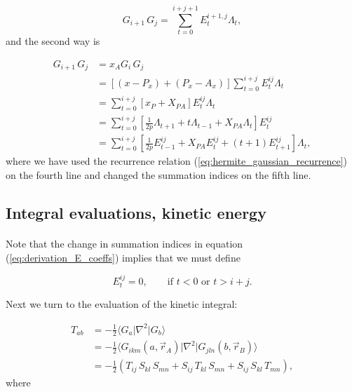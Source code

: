 \documentclass[%
twoside,                 %
final,                   %
10pt]{article}
\begin{document}
\begin{equation}
 G_{i+1}\,G_j= \sum_{t=0}^{i+j+1}E^{i+1,j}_t \Lambda_t,
\end{equation}
and the second way is

\begin{equation}
\label{eq:derivation_E_coeffs}
\begin{split}
 G_{i+1}\,G_j & = x_A G_i\,G_j \\
              & = [(x - P_x) + (P_x - A_x)]\sum_{t=0}^{i+j} E^{ij}_t \Lambda_t\\
              & = \sum_{t=0}^{i+j}[x_P + X_{PA}] E^{ij}_t \Lambda_t \\
              & = \sum_{t=0}^{i+j}[\frac{1}{2p}\Lambda_{t+1} + t\Lambda_{t-1} + X_{PA}\Lambda_t]E^{ij}_t \\
              & = \sum_{t=0}^{i+j}[\frac{1}{2p}E^{ij}_{t-1} + X_{PA}E^{ij}_t + (t+1)E^{ij}_{t+1}] \Lambda_t,
\end{split}
\end{equation}
where we have used the recurrence relation (\ref{eq:hermite_gaussian_recurrence}) on the fourth line and changed the 
summation indices on the fifth line.



\subsection*{Integral evaluations, kinetic energy}

\paragraph{}

Note that the change in summation indices in equation (\ref{eq:derivation_E_coeffs}) implies that we must define

\begin{equation}
 E^{ij}_t = 0, \qquad \text{if }t<0\text{ or }t > i + j.
\end{equation}

Next we turn to the evaluation of the kinetic integral:

\begin{equation}
\begin{split}
T_{ab} & = -\frac{1}{2}\langle G_a\vert\nabla^2\vert G_b\rangle \\
       & = -\frac{1}{2}\langle G_{ikm}(a, \vec r_A)\vert\nabla^2\vert G_{jln}(b, \vec r_B)\rangle \\
       & = -\frac{1}{2}(T_{ij}\,S_{kl}\,S_{mn} + S_{ij}\,T_{kl}\,S_{mn} + S_{ij}\,S_{kl}\,T_{mn}),
\end{split}
\end{equation}
where
\end{document}
